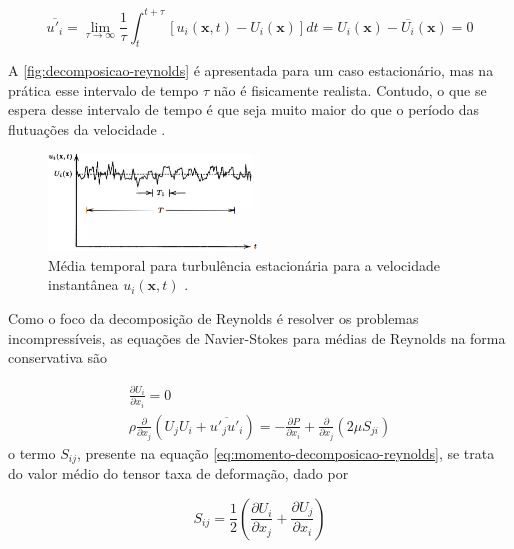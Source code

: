 \begin{equation}
	\overline{u'_{i}} = \lim_{\tau \rightarrow \infty} \frac{1}{\tau}\int_{t}^{t+\tau} \left[u_i(\textbf{x},t) - U_i(\textbf{x}) \right] dt = U_i(\textbf{x}) - \overline{U_{i}}(\textbf{x}) = 0
\end{equation}

A \autoref{fig:decomposicao-reynolds} é apresentada para um caso estacionário, mas na prática esse intervalo de tempo \(\tau\) não é fisicamente realista. Contudo, o que se espera desse intervalo de tempo é que seja muito maior do que o período das flutuações da velocidade \cite{Wilcox2006}. 

\begin{figure}[!ht]
	\centering
	\includegraphics[width=0.5\textwidth]{foto01-decomposicao-reynolds.png}   
	\caption[Média temporal para turbulência estacionária para a velocidade instantânea \(u_i(\textbf{x},t)\).]{Média temporal para turbulência estacionária para a velocidade instantânea \(u_i(\textbf{x},t)\) \cite{Wilcox2006}.}
	\label{fig:decomposicao-reynolds}
\end{figure}

Como o foco da decomposição de Reynolds é resolver os problemas incompressíveis, as equações de Navier-Stokes para médias de Reynolds na forma conservativa são

\begin{gather}
	\label{eq:continuidade-decomposicao-reynolds}
	\frac{\partial U_i}{\partial x_i} = 0 \\
	\label{eq:momento-decomposicao-reynolds}
	\rho\frac{\partial}{\partial x_j}\left(U_{j}U_{i} + \overline{u'_j u'_i} \right) = -\frac{\partial P}{\partial x_i} + \frac{\partial}{\partial x_j}\left(2\mu S_{ji}\right)
\end{gather}
%
o termo \(S_{ij}\), presente na equação \ref{eq:momento-decomposicao-reynolds}, se trata do valor médio do tensor taxa de deformação, dado por

\begin{equation}
    \label{eq:tensor-medio-taxadeformacao}
    S_{ij} = \frac{1}{2}\left(\frac{\partial U_i}{\partial x_j} + \frac{\partial U_j}{\partial x_i} \right)
\end{equation}


